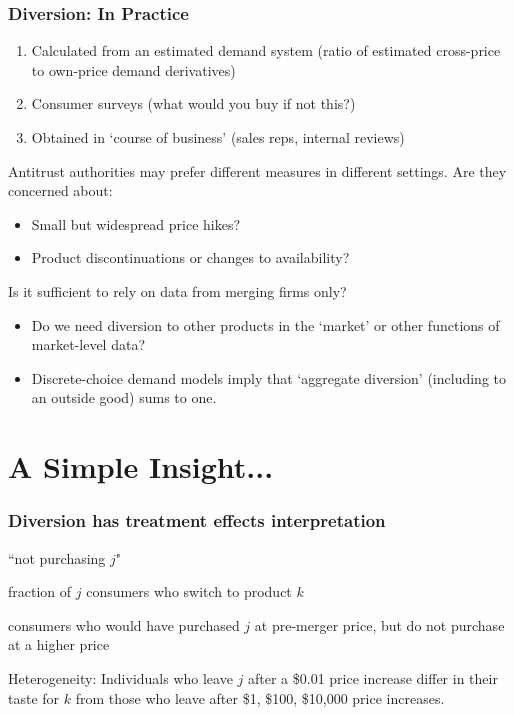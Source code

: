 \documentclass[xcolor=pdftex,dvipsnames,table,mathserif,aspectratio=169]{beamer}
\begin{document}
\begin{frame}
\frametitle{Diversion: In Practice}
\footnotesize
\begin{enumerate}
\item Calculated from an estimated demand system (ratio of estimated cross-price to own-price demand derivatives)
\item Consumer surveys (what would you buy if not this?)
\item Obtained in `course of business' (sales reps, internal reviews)
\end{enumerate}
Antitrust authorities may prefer different measures in different settings. Are they concerned about:
\begin{itemize}
\item Small but widespread price hikes?
\item Product discontinuations or changes to availability?
\end{itemize}
Is it sufficient to rely on data from merging firms only?
\begin{itemize}
\item Do we need diversion to other products in the `market' or other functions of market-level data?
\item Discrete-choice demand models imply that `aggregate diversion' (including to an outside good) sums to one.
\end{itemize}
\end{frame}



\section*{A Simple Insight...}

\begin{frame}
\frametitle{Diversion has treatment effects interpretation}
\begin{description}[labelwidth=\widthof{\bfseries Treated group}]
\item[Treatment] ``not purchasing $j$"
\item[Outcome] fraction of $j$ consumers who switch to product $k$
\item[Treated group] consumers who would have purchased $j$ at pre-merger price, but do not purchase at a higher price
\end{description}

Heterogeneity: Individuals who leave $j$ after a \$0.01 price increase differ in their taste for $k$ from those who leave after \$1, \$100, \$10,000 price increases.
\end{frame}
\end{document}
